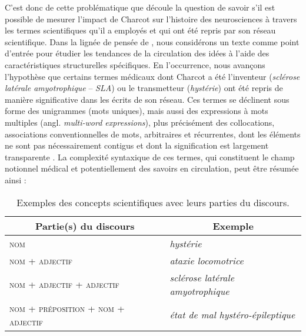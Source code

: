 C'est donc de cette problématique que découle la question de savoir s'il est possible de mesurer l'impact de Charcot sur l'histoire des neurosciences à travers les termes scientifiques qu'il a employés et qui ont été repris par son réseau scientifique. Dans la lignée de pensée de \citet{milia2023}, nous considérons un texte comme point d'entrée pour étudier les tendances de la circulation des idées à l'aide des caractéristiques structurelles spécifiques. En l'occurrence, nous avançons l'hypothèse que certains termes médicaux dont Charcot a été l'inventeur (\textit{sclérose latérale amyotrophique} -- \textit{SLA}) ou le transmetteur (\textit{hystérie}) ont été repris de manière significative dans les écrits de son réseau. Ces termes se déclinent sous forme des unigrammes (mots uniques), mais aussi des expressions à mots multiples (angl. \textit{multi-word expressions}), plus précisément des collocations, \og{}associations conventionnelles de mots, arbitraires et récurrentes, dont les éléments ne sont pas nécessairement contigus et dont la signification est largement transparente\fg{} \citep[p. 96]{nerima2006}. La complexité syntaxique de ces termes, qui constituent le champ notionnel médical et potentiellement des savoirs en circulation, peut être résumée ainsi :
\begin{table}[h]
	\centering
	\begin{tabular}{l|l}
		\multicolumn{1}{c|}{Partie(s) du discours} & \multicolumn{1}{c}{Exemple} \\
		\hline
		\textsc{nom} & \textit{hystérie}\\
		\textsc{nom + adjectif} & \textit{ataxie locomotrice}\\
		\textsc{nom + adjectif + adjectif} & \textit{sclérose latérale amyotrophique}\\
		\textsc{nom + préposition + nom + adjectif} & \textit{état de mal hystéro-épileptique}
	\end{tabular}
	\caption{Exemples des concepts scientifiques avec leurs parties du discours.}
\end{table}

